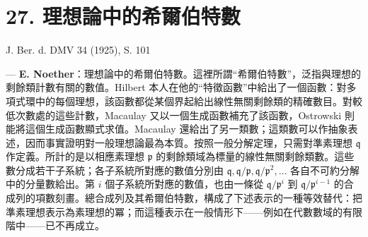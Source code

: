 \documentclass[11pt]{article}
\begin{document}
\section*{27. 理想論中的希爾伯特數}

\begin{center}
J. Ber. d. DMV 34 (1925), S. 101
\end{center}

--- \textbf{E. Noether}：理想論中的希爾伯特數。這裡所謂“希爾伯特數”，泛指與理想的剩餘類計數有關的數值。Hilbert 本人在他的“特徵函數”中給出了一個函數：對多項式環中的每個理想，該函數都從某個界起給出線性無關剩餘類的精確數目。對較低次數處的這些計數，Macaulay 又以一個生成函數補充了該函數，Ostrowski 則能將這個生成函數顯式求值。Macaulay 還給出了另一類數；這類數可以作抽象表述，因而事實證明對一般理想論最為本質。按照一般分解定理，只需對準素理想 $\mathfrak q$ 作定義。所計的是以相應素理想 $\mathfrak p$ 的剩餘類域為標量的線性無關剩餘類數。這些數分成若干子系統；各子系統所對應的數值分別由 $\mathfrak q,\mathfrak q/\mathfrak p,\mathfrak q/\mathfrak p^2,\ldots$ 各自不可約分解中的分量數給出。第 $i$ 個子系統所對應的數值，也由一條從 $\mathfrak q/\mathfrak p^i$ 到 $\mathfrak q/\mathfrak p^{i-1}$ 的合成列的項數刻畫。總合成列及其希爾伯特數，構成了下述表示的一種等效替代：把準素理想表示為素理想的冪；而這種表示在一般情形下——例如在代數數域的有限階中——已不再成立。
\end{document}
